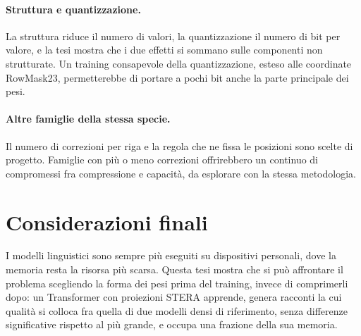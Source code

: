 \paragraph{Struttura e quantizzazione.} La struttura riduce il numero di valori, la quantizzazione il numero di bit per valore, e la tesi mostra che i due effetti si sommano sulle componenti non strutturate. Un training consapevole della quantizzazione, esteso alle coordinate RowMask23, permetterebbe di portare a pochi bit anche la parte principale dei pesi.

\paragraph{Altre famiglie della stessa specie.} Il numero di correzioni per riga e la regola che ne fissa le posizioni sono scelte di progetto. Famiglie con più o meno correzioni offrirebbero un continuo di compromessi fra compressione e capacità, da esplorare con la stessa metodologia.

\section{Considerazioni finali}

I modelli linguistici sono sempre più eseguiti su dispositivi personali, dove la memoria resta la risorsa più scarsa. Questa tesi mostra che si può affrontare il problema scegliendo la forma dei pesi prima del training, invece di comprimerli dopo: un Transformer con proiezioni STERA apprende, genera racconti la cui qualità si colloca fra quella di due modelli densi di riferimento, senza differenze significative rispetto al più grande, e occupa una frazione della sua memoria.
